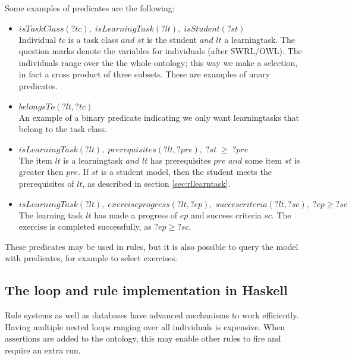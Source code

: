 Some examples of predicates are the following:
\begin{itemize}

\item $\mathit{isTaskClass(?tc), \; isLearningTask(?lt), \; isStudent(?st)}$\\
Individual $\mathit{tc}$ is a task class $\mathit{and}$  $\mathit{st}$ is the student $\mathit{and}$ $\mathit{lt}$ a learningtask.
The question marks denote the variables for individuals (after SWRL/OWL). 
The individuals range over the the whole ontology; this way we make a selection, in fact a cross product of three subsets.
These are examples of unary predicates.  

\item $\mathit{belongsTo(?lt, ?tc)}$\\
An example of a binary predicate indicating we only want learningtasks that belong to the task class.

\item  $\mathit{ isLearningTask(?lt), \; prerequisites(?lt, ?pre),  \; ?st \; \geq \; ?pre}$ \\
The item $\mathit{lt}$ is a learningtask  $\mathit{and}$  $\mathit{lt}$ has prerequisites $\mathit{pre}$  $\mathit{and}$ some item  $\mathit{st}$ is greater then  $\mathit{pre}$.
If  $\mathit{st}$ is a student model, then the student meets the prerequisites of $\mathit{lt}$, as described in section \ref{sec:rllearntask}. 

\item $\mathit{isLearningTask(?lt), \; exerciseprogress(?lt, ?ep), \; succescriteria(?lt, ?sc), \; ?ep \geq ?sc }$\\
The learning task $\mathit{lt}$ has made a progress of $\mathit{ep}$ and success criteria $\mathit{sc}$.
The exercise is completed successfully, as $\mathit{?ep \geq ?sc}$. 
\end{itemize}

These predicates may be used in rules, but it is also possible to query the model with predicates, for example to select exercises.


\subsection{The loop and rule implementation in Haskell}
Rule systems as well as databases have advanced mechanisms to work efficiently.
Having multiple nested loops ranging over all individuals is expensive.
When assertions are added to the ontology, this may enable other rules to fire and require an extra run.

